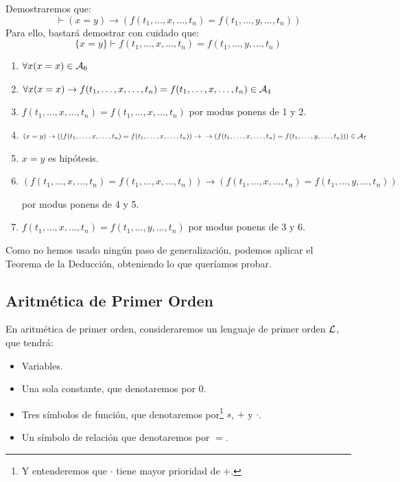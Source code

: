 \begin{ejemplo}
    Demostraremos que:
    \begin{equation*}
        \vdash (x=y) \to (f(t_1,\ldots,x,\ldots,t_n) = f(t_1,\ldots,y,\ldots,t_n))
    \end{equation*}
    Para ello, bastará demostrar con cuidado que:
    \begin{equation*}
        \{x=y\} \vdash f(t_1,\ldots,x,\ldots,t_n) = f(t_1,\ldots,y,\ldots,t_n)
    \end{equation*}
    \begin{enumerate}
        \item $\forall x(x=x)\in \mathcal{A}_6$ 
        \item $\forall x(x=x)\to f(t_1,\dots,x,\dots,t_n)=f(t_1,\dots,x,\dots,t_n)\in \mathcal{A}_4$
        \item $f(t_1,\dots,x,\dots,t_n)=f(t_1,\dots,x,\dots,t_n)$ por modus ponens de 1 y 2.
        \item $(x=y)\to ((f(t_1,\dots,x,\dots,t_n)=f(t_1,\dots,x,\dots,t_n))\to \\ \to (f(t_1,\dots,x,\dots,t_n)=f(t_1,\dots,y,\dots,t_n))) \in \mathcal{A}_7$
        \item $x=y$ es hipótesis.
        \item $(f(t_1,\ldots,x,\ldots,t_n)=f(t_1,\ldots,x,\ldots,t_n))\to (f(t_1,\ldots,x,\ldots,t_n)=f(t_1,\ldots,y,\ldots,t_n))$ 

            por modus ponens de 4 y 5.
        \item $f(t_1,\ldots,x,\ldots,t_n)=f(t_1,\ldots,y,\ldots,t_n)$ por modus ponens de 3 y 6.
    \end{enumerate}
    Como no hemos usado ningún paso de generalización, podemos aplicar el Teorema de la Deducción, obteniendo lo que queríamos probar.
\end{ejemplo}

\subsection{Aritmética de Primer Orden}
En aritmética de primer orden, consideraremos un lenguaje de primer orden $\mathcal{L}$, que tendrá:
\begin{itemize}
    \item Variables.
    \item Una sola constante, que denotaremos por $0$.
    \item Tres símbolos de función, que denotaremos por\footnote{Y entenderemos que $\cdot $ tiene mayor prioridad de $+$.} $s$, $+$ y $\cdot $.
    \item Un símbolo de relación que denotaremos por $=$.
\end{itemize}

